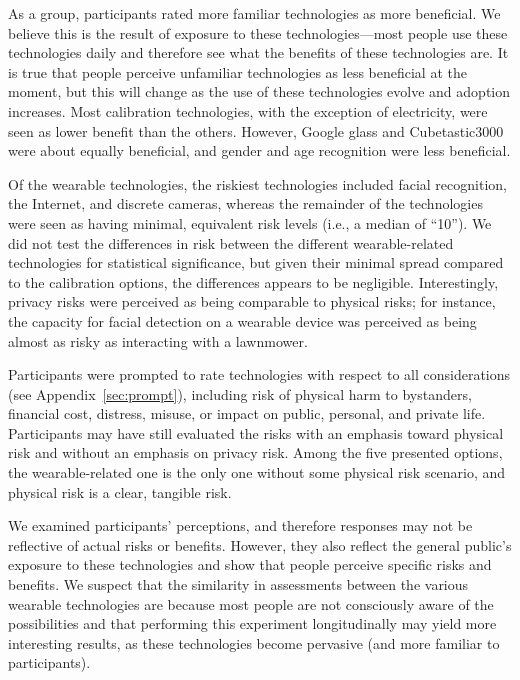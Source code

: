 As a group, participants rated more familiar technologies as more beneficial. We believe this is the result of exposure to these technologies---most people use these technologies daily and therefore see what the benefits of these technologies are. It is true that people perceive unfamiliar technologies as less beneficial at the moment, but this will change as the use of these technologies evolve and adoption increases. Most calibration technologies, with the exception of electricity, were seen as lower benefit than the others. However, Google glass and Cubetastic3000 were about equally beneficial, and gender and age recognition were less beneficial. 

Of the wearable technologies, the riskiest technologies included facial recognition, the Internet, and discrete cameras, whereas the remainder of the technologies were seen as having minimal, equivalent risk levels (i.e., a median of ``10''). We did not test the differences in risk between the different wearable-related technologies for statistical significance, but given their minimal spread compared to the calibration options, the differences appears to be negligible. Interestingly, privacy risks were perceived as being comparable to physical risks; for instance, the capacity for facial detection on a wearable device was perceived as being almost as risky as interacting with a lawnmower. 

Participants were prompted to rate technologies with respect to all considerations (see Appendix~\ref{sec:prompt}), including risk of physical harm to bystanders, financial cost, distress, misuse, or impact on public, personal, and private life. Participants may have still evaluated the risks with an emphasis toward physical risk and without an emphasis on privacy risk. Among the five presented options, the wearable-related one is the only one without some physical risk scenario, and physical risk is a clear, tangible risk. 

We examined participants' perceptions, and therefore responses may not be reflective of actual risks or benefits. However, they also reflect the general public's exposure to these technologies and show that people perceive specific risks and benefits. We suspect that the similarity in assessments between the various wearable technologies are because most people are not consciously aware of the possibilities and that performing this experiment longitudinally may yield more interesting results, as these technologies become pervasive (and more familiar to participants).
